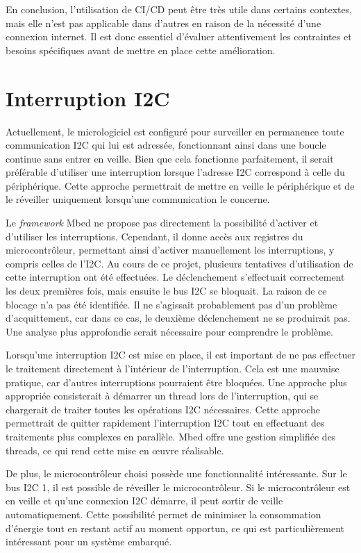 En conclusion, l'utilisation de CI/CD peut être très utile dans certains contextes, mais elle n'est pas applicable dans d'autres en raison de la nécessité d'une connexion internet.
Il est donc essentiel d'évaluer attentivement les contraintes et besoins spécifiques avant de mettre en place cette amélioration.

\section{Interruption I2C}

Actuellement, le micrologiciel est configuré pour surveiller en permanence toute communication I2C qui lui est adressée, fonctionnant ainsi dans une boucle continue sans entrer en veille.
Bien que cela fonctionne parfaitement, il serait préférable d'utiliser une interruption lorsque l'adresse I2C correspond à celle du périphérique.
Cette approche permettrait de mettre en veille le périphérique et de le réveiller uniquement lorsqu'une communication le concerne.

Le \textit{\gls{framework}} Mbed ne propose pas directement la possibilité d'activer et d'utiliser les interruptions.
Cependant, il donne accès aux registres du microcontrôleur, permettant ainsi d'activer manuellement les interruptions, y compris celles de l'I2C.
Au cours de ce projet, plusieurs tentatives d'utilisation de cette interruption ont été effectuées.
Le déclenchement s'effectuait correctement les deux premières fois, mais ensuite le bus I2C se bloquait.
La raison de ce blocage n'a pas été identifiée.
Il ne s'agissait probablement pas d'un problème d'acquittement, car dans ce cas, le deuxième déclenchement ne se produirait pas.
Une analyse plus approfondie serait nécessaire pour comprendre le problème.

Lorsqu'une interruption I2C est mise en place, il est important de ne pas effectuer le traitement directement à l'intérieur de l'interruption.
Cela est une mauvaise pratique, car d'autres interruptions pourraient être bloquées.
Une approche plus appropriée consisterait à démarrer un thread lors de l'interruption, qui se chargerait de traiter toutes les opérations I2C nécessaires.
Cette approche permettrait de quitter rapidement l'interruption I2C tout en effectuant des traitements plus complexes en parallèle.
Mbed offre une gestion simplifiée des threads, ce qui rend cette mise en œuvre réalisable.

De plus, le microcontrôleur choisi possède une fonctionnalité intéressante.
Sur le bus I2C 1, il est possible de réveiller le microcontrôleur. Si le microcontrôleur est en veille et qu'une connexion I2C démarre, il peut sortir de veille automatiquement.
Cette possibilité permet de minimiser la consommation d'énergie tout en restant actif au moment opportun, ce qui est particulièrement intéressant pour un système embarqué.

